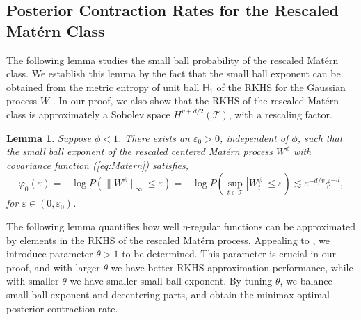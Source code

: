 \documentclass[ejs,noshowframe]{imsart}
\theoremstyle{plain}
\newtheorem{lemma}[theorem]{Lemma}
\theoremstyle{definition}
\theoremstyle{remark}
\begin{document}
\subsection{Posterior Contraction Rates for the Rescaled Mat\'ern Class}\label{section3.2}
The following lemma studies the small ball probability of the rescaled Mat\'ern class. We establish this  lemma by the fact that the small ball exponent can be obtained from the metric entropy of  unit ball $\mathbb{H}_1$ of the RKHS for the Gaussian process $W$ \citep{li1999approximation}. In our proof, we also show that the RKHS  of the rescaled Mat\'ern class is approximately a Sobolev space $H^{v+d/2}(\mathcal{T})$, with a rescaling factor. 
\begin{lemma}
Suppose $\phi < 1$. There exists an $\varepsilon_0>0$, independent of $\phi$, such that 
the small ball exponent of the rescaled  centered Mat\'ern 
 process $W^\phi$ with  covariance function  (\ref{eq:Matern}) satisfies,
$$
\varphi_0(\varepsilon) = -\log P(\| W^\phi\|_{\infty} \le \varepsilon)= - \log P(\sup_{t \in \mathcal{T}} |W_t^\phi| \le \varepsilon) 
 \lesssim \varepsilon^{-d/v} \phi^{-d},
 $$
for $\varepsilon \in (0,\varepsilon_0)$.
 \label{matern small ball}
\end{lemma}


The following lemma quantifies how well $\eta$-regular functions can be approximated by elements in the RKHS of the rescaled Mat\'ern process. Appealing to \cite{van2007bayesian}, we introduce parameter $\theta>1$ to be determined. This parameter is crucial in our proof, and with larger $\theta$  we have better RKHS approximation performance, while with smaller $\theta$ we have smaller small ball exponent. By tuning $\theta$,  we balance small ball exponent  and decentering parts, and obtain the minimax optimal posterior contraction rate.
\end{document}
